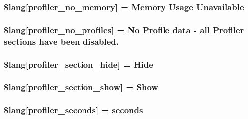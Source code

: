 \subsubsection[{\$lang}]{\setlength{\rightskip}{0pt plus 5cm}\$lang\mbox{[}\textquotesingle{}profiler\+\_\+no\+\_\+memory\textquotesingle{}\mbox{]} = \textquotesingle{}Memory Usage Unavailable\textquotesingle{}}\label{profiler__lang_8php_a32345afdaa3f160ba1d21d03223313ad}
\hypertarget{profiler__lang_8php_aabea841eed12fa8271f13656fa7d5457}{}
\subsubsection[{\$lang}]{\setlength{\rightskip}{0pt plus 5cm}\$lang\mbox{[}\textquotesingle{}profiler\+\_\+no\+\_\+profiles\textquotesingle{}\mbox{]} = \textquotesingle{}No Profile data -\/ {\bf all} Profiler sections have been disabled.\textquotesingle{}}\label{profiler__lang_8php_aabea841eed12fa8271f13656fa7d5457}
\hypertarget{profiler__lang_8php_a137158ebe1d58bd53bbbb4594f2bc0ed}{}
\subsubsection[{\$lang}]{\setlength{\rightskip}{0pt plus 5cm}\$lang\mbox{[}\textquotesingle{}profiler\+\_\+section\+\_\+hide\textquotesingle{}\mbox{]} = \textquotesingle{}Hide\textquotesingle{}}\label{profiler__lang_8php_a137158ebe1d58bd53bbbb4594f2bc0ed}
\hypertarget{profiler__lang_8php_a3e3b1984f57780efbdaf6d01dac31f3c}{}
\subsubsection[{\$lang}]{\setlength{\rightskip}{0pt plus 5cm}\$lang\mbox{[}\textquotesingle{}profiler\+\_\+section\+\_\+show\textquotesingle{}\mbox{]} = \textquotesingle{}Show\textquotesingle{}}\label{profiler__lang_8php_a3e3b1984f57780efbdaf6d01dac31f3c}
\hypertarget{profiler__lang_8php_a6d6060d6ca0da3c1e6d4168914d7e362}{}
\subsubsection[{\$lang}]{\setlength{\rightskip}{0pt plus 5cm}\$lang\mbox{[}\textquotesingle{}profiler\+\_\+seconds\textquotesingle{}\mbox{]} = \textquotesingle{}seconds\textquotesingle{}}\label{profiler__lang_8php_a6d6060d6ca0da3c1e6d4168914d7e362}
